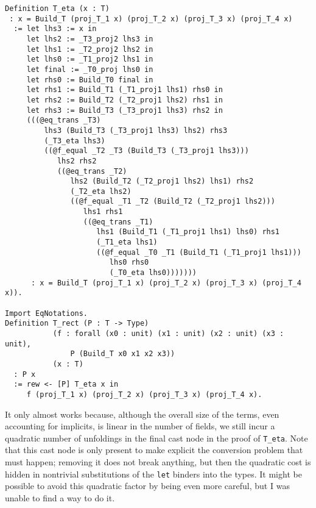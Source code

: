 \begin{verbatim}
Definition T_eta (x : T)
 : x = Build_T (proj_T_1 x) (proj_T_2 x) (proj_T_3 x) (proj_T_4 x)
  := let lhs3 := x in
     let lhs2 := _T3_proj2 lhs3 in
     let lhs1 := _T2_proj2 lhs2 in
     let lhs0 := _T1_proj2 lhs1 in
     let final := _T0_proj lhs0 in
     let rhs0 := Build_T0 final in
     let rhs1 := Build_T1 (_T1_proj1 lhs1) rhs0 in
     let rhs2 := Build_T2 (_T2_proj1 lhs2) rhs1 in
     let rhs3 := Build_T3 (_T3_proj1 lhs3) rhs2 in
     (((@eq_trans _T3)
         lhs3 (Build_T3 (_T3_proj1 lhs3) lhs2) rhs3
         (_T3_eta lhs3)
         ((@f_equal _T2 _T3 (Build_T3 (_T3_proj1 lhs3)))
            lhs2 rhs2
            ((@eq_trans _T2)
               lhs2 (Build_T2 (_T2_proj1 lhs2) lhs1) rhs2
               (_T2_eta lhs2)
               ((@f_equal _T1 _T2 (Build_T2 (_T2_proj1 lhs2)))
                  lhs1 rhs1
                  ((@eq_trans _T1)
                     lhs1 (Build_T1 (_T1_proj1 lhs1) lhs0) rhs1
                     (_T1_eta lhs1)
                     ((@f_equal _T0 _T1 (Build_T1 (_T1_proj1 lhs1)))
                        lhs0 rhs0
                        (_T0_eta lhs0)))))))
      : x = Build_T (proj_T_1 x) (proj_T_2 x) (proj_T_3 x) (proj_T_4 x)).

Import EqNotations.
Definition T_rect (P : T -> Type)
           (f : forall (x0 : unit) (x1 : unit) (x2 : unit) (x3 : unit),
               P (Build_T x0 x1 x2 x3))
           (x : T)
  : P x
  := rew <- [P] T_eta x in
     f (proj_T_1 x) (proj_T_2 x) (proj_T_3 x) (proj_T_4 x).
\end{verbatim}
  It only almost works because, although the overall size of the terms, even accounting for implicits, is linear in the number of fields, we still incur a quadratic number of unfoldings in the final cast node in the proof of \texttt{T_eta}.
  Note that this cast node is only present to make explicit the conversion problem that must happen; removing it does not break anything, but then the quadratic cost is hidden in nontrivial substitutions of the \texttt{let} binders into the types.
  It might be possible to avoid this quadratic factor by being even more careful, but I was unable to find a way to do it.%
